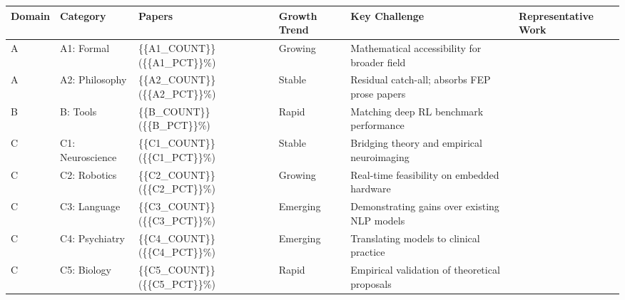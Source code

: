\documentclass[
]{article}
\newcounter{none} %
\begin{document}
{\def\LTcaptype{none} %
\begin{longtable}[]{@{}
  >{\raggedright\arraybackslash}p{}
  >{\raggedright\arraybackslash}p{}
  >{\raggedright\arraybackslash}p{}
  >{\raggedright\arraybackslash}p{}
  >{\raggedright\arraybackslash}p{}
  >{\raggedright\arraybackslash}p{}@{}}
\toprule\noalign{}
\begin{minipage}[b]{\linewidth}\raggedright
Domain
\end{minipage} & \begin{minipage}[b]{\linewidth}\raggedright
Category
\end{minipage} & \begin{minipage}[b]{\linewidth}\raggedright
Papers
\end{minipage} & \begin{minipage}[b]{\linewidth}\raggedright
Growth Trend
\end{minipage} & \begin{minipage}[b]{\linewidth}\raggedright
Key Challenge
\end{minipage} & \begin{minipage}[b]{\linewidth}\raggedright
Representative Work
\end{minipage} \\
\midrule\noalign{}
\endhead
\bottomrule\noalign{}
\endlastfoot
A & A1: Formal & \{\{A1\_COUNT\}\} (\{\{A1\_PCT\}\}\%) & Growing &
Mathematical accessibility for broader field &
\citep{sakthivadivel2023bayesian} \\
A & A2: Philosophy & \{\{A2\_COUNT\}\} (\{\{A2\_PCT\}\}\%) & Stable &
Residual catch-all; absorbs FEP prose papers &
\citep{friston2010free} \\
B & B: Tools & \{\{B\_COUNT\}\} (\{\{B\_PCT\}\}\%) & Rapid & Matching
deep RL benchmark performance & \citep{fountas2020deep} \\
C & C1: Neuroscience & \{\{C1\_COUNT\}\} (\{\{C1\_PCT\}\}\%) & Stable &
Bridging theory and empirical neuroimaging &
\citep{clark2013whatever} \\
C & C2: Robotics & \{\{C2\_COUNT\}\} (\{\{C2\_PCT\}\}\%) & Growing &
Real-time feasibility on embedded hardware &
\citep{lanillos2021active} \\
C & C3: Language & \{\{C3\_COUNT\}\} (\{\{C3\_PCT\}\}\%) & Emerging &
Demonstrating gains over existing NLP models &
\citep{friston2020generative} \\
C & C4: Psychiatry & \{\{C4\_COUNT\}\} (\{\{C4\_PCT\}\}\%) & Emerging &
Translating models to clinical practice &
\citep{smith2021computational} \\
C & C5: Biology & \{\{C5\_COUNT\}\} (\{\{C5\_PCT\}\}\%) & Rapid &
Empirical validation of theoretical proposals &
\citep{kuchling2020morphogenesis} \\
\end{longtable}
}
\end{document}
